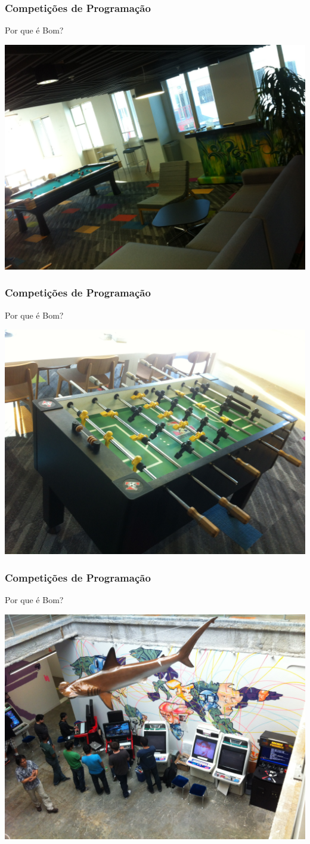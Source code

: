\begin{frame}
\frametitle{Competições de Programação}
\begin{block}{Por que é Bom?}
\begin{center}
	\includegraphics[width=.7\textwidth]{sntc/IMG_2051.JPG}
\end{center}
\end{block}
\end{frame}
\begin{frame}
\frametitle{Competições de Programação}
\begin{block}{Por que é Bom?}
\begin{center}
	\includegraphics[width=.7\textwidth]{sntc/IMG_2052.JPG}
\end{center}
\end{block}
\end{frame}
\begin{frame}
\frametitle{Competições de Programação}
\begin{block}{Por que é Bom?}
\begin{center}
	\includegraphics[width=.7\textwidth]{sntc/IMG_2056.JPG}
\end{center}
\end{block}
\end{frame}
